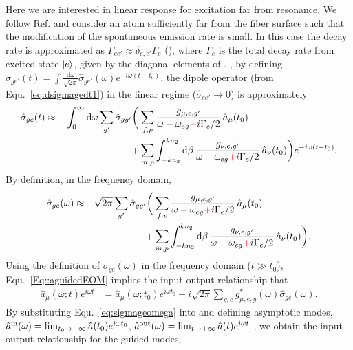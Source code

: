 Here we are interested in linear response for excitation far from resonance.  We follow Ref. \cite{LeKien2014a} and consider an atom sufficiently far from the fiber surface such that the modification of the spontaneous emission rate is small.   In this case the decay rate is approximated as $\Gamma_{ee'} \approx \delta_{e,e'} \Gamma_{e}$ (), where $\Gamma_e$ is the total decay rate from excited state $\lvert{e}\rangle$, given by the diagonal elements of .  , by defining $ \hat{\sigma}_{ge'}(t)=\int \frac{\mathrm{d}\omega}{\sqrt{2\pi}}\hat{\sigma}_{ge'}(\omega) e^{-i\omega(t-t_0)} $, the dipole operator (from Equ.~\eqref{eq:dsigmagedt1}) in the linear regime ($\hat{\sigma}_{ee'} \rightarrow 0 $) is approximately
	\begin{align}\label{eq:sigmagetint}
		\hat{\sigma}_{ge}(t) \approx -\int_0^{\infty}\mathrm{d}\omega \sum_{g'} \hat{\sigma}_{gg'}\bigg( & \sum_{f,p}  
\frac{g_{\mu, e,g'}}{\omega-\omega_{eg} \error{+} i \Gamma_{e}/2  }\, \hat{a}_\mu (t_0) \\
	+& \sum_{m,p} \int_{-kn_2}^{kn_2}\mathrm{d}\beta \, \frac{g_{\nu, e,g'}}{\omega-\omega_{eg} \error{+} i \Gamma_{e}/2 } \,\hat{a}_\nu (t_0)  \bigg)e^{-i\omega (t-t_0)} . \nn
	\end{align}
By definition, in the frequency domain, 
\begin{align}\label{eq:sigmageomega}
		\hat{\sigma}_{ge}(\omega) \approx - \sqrt{2\pi}\sum_{g'} \hat{\sigma}_{gg'}\bigg( & \sum_{f,p}  
\frac{g_{\mu, e,g'}}{\omega-\omega_{eg} \error{+} i \Gamma_{e}/2  }\, \hat{a}_\mu (t_0) \\
	+& \sum_{m,p} \int_{-kn_2}^{kn_2}\mathrm{d}\beta \, \frac{g_{\nu, e,g'}}{\omega-\omega_{eg} \error{+} i \Gamma_{e}/2 } \,\hat{a}_\nu (t_0)  \bigg) . \nn
\end{align}
Using the definition of $ \sigma_{ge}(\omega) $ in the frequency domain ($ t\gg t_0 $), Equ.~\eqref{Eq::aguidedEOM} implies the input-output relationship that
\begin{align}\label{Eq::aguidedomega}
\hat{a}_\mu(\omega;t )e^{i\omega t} &= \hat{a}_\mu(\omega;t_0)e^{i\omega t_0} +i \sqrt{2\pi}\sum_{g,e}g_{\mu,e,g}^*(\omega)\hat{\sigma}_{ge}(\omega). 
\end{align}
By substituting Equ.~\eqref{eq:sigmageomega} into  and defining asymptotic modes,  $\hat{a}^{{\rm in}}(\omega) = \lim_{t_0\rightarrow -\infty} \hat{a}(t_0) e^{i\omega t_0}$, $\hat{a}^{{\rm out}}(\omega) = \lim_{t\rightarrow +\infty} \hat{a}(t) e^{i\omega t}$ \cite{Fan2010}, we obtain the input-output relationship for the guided modes,
